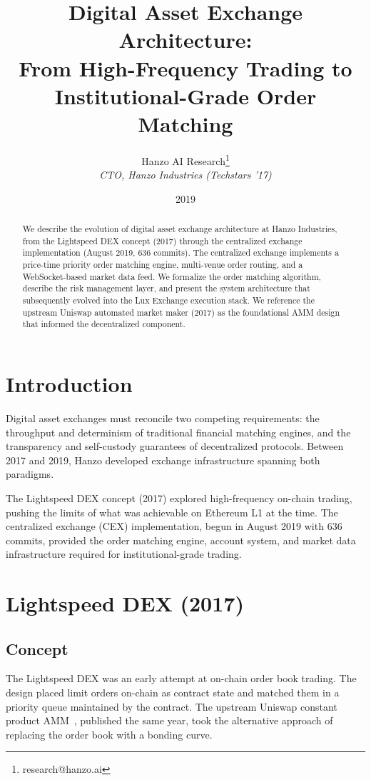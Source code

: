 \documentclass[11pt,a4paper]{article}
\title{Digital Asset Exchange Architecture:\\From High-Frequency Trading to\\Institutional-Grade Order Matching}
\author{Hanzo AI Research\thanks{research@hanzo.ai} \\ \textit{CTO, Hanzo Industries (Techstars '17)}}
\date{2019}
\begin{document}
\hanzocoverpage

\begin{abstract}
We describe the evolution of digital asset exchange architecture at Hanzo Industries, from the Lightspeed DEX concept (2017) through the centralized exchange implementation (August 2019, 636 commits). The centralized exchange implements a price-time priority order matching engine, multi-venue order routing, and a WebSocket-based market data feed. We formalize the order matching algorithm, describe the risk management layer, and present the system architecture that subsequently evolved into the Lux Exchange execution stack. We reference the upstream Uniswap automated market maker (2017) as the foundational AMM design that informed the decentralized component.
\end{abstract}

\section{Introduction}

Digital asset exchanges must reconcile two competing requirements: the throughput and determinism of traditional financial matching engines, and the transparency and self-custody guarantees of decentralized protocols. Between 2017 and 2019, Hanzo developed exchange infrastructure spanning both paradigms.

The Lightspeed DEX concept (2017) explored high-frequency on-chain trading, pushing the limits of what was achievable on Ethereum L1 at the time. The centralized exchange (CEX) implementation, begun in August 2019 with 636 commits, provided the order matching engine, account system, and market data infrastructure required for institutional-grade trading.

\section{Lightspeed DEX (2017)}

\subsection{Concept}

The Lightspeed DEX was an early attempt at on-chain order book trading. The design placed limit orders on-chain as contract state and matched them in a priority queue maintained by the contract. The upstream Uniswap constant product AMM~\cite{uniswap2017}, published the same year, took the alternative approach of replacing the order book with a bonding curve.
\end{document}
